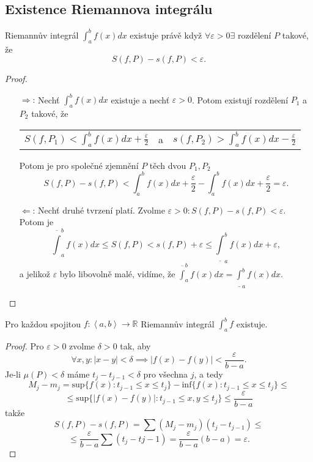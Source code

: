 \documentclass[../main.tex]{subfiles}
\begin{document}
\subsection{Existence Riemannova integrálu}
\begin{theorem}
	Riemannův integrál $\int^b_a f(x) dx$ existuje právě když $\forall \varepsilon > 0 \exists$ rozdělení $P$ takové, že
	\[S(f,P) - s(f,P) < \varepsilon.\]
\end{theorem}

\begin{proof}
	\begin{enumerate}
		\item[$\Rightarrow$:] Nechť $\int^b_a f(x) dx$ existuje a nechť $\varepsilon > 0$. Potom existují rozdělení $P_1$ a $P_2$ takové, že
	    \begin{center}
	        \begin{tabular}{ c c c }
	            $S(f,P_1) < \int^b_a f(x) dx + \frac{\varepsilon}{2}$ & a & $s(f,P_2) > \int^b_a f(x) dx - \frac{\varepsilon}{2}$  \\
	        \end{tabular}
	    \end{center}
	    Potom je pro společné zjemnění $P$ těch dvou $P_1,P_2$
	    \[S(f,P) - s(f,P) < \int^b_a f(x)dx + \frac{\varepsilon}{2} - \int^b_a f(x)dx + \frac{\varepsilon}{2} = \varepsilon.\]
	    \item[$\Leftarrow$:] Nechť druhé tvrzení platí. Zvolme $\varepsilon > 0 : S(f,P) - s(f,P) < \varepsilon.$ Potom je 
	    \[\overline{\int}^b_a f(x)dx \leq S(f,P) < s(f,P) + \varepsilon \leq \underline{\int}^b_a f(x)dx + \varepsilon,\]
	    a jelikož $\varepsilon$ bylo libovolně malé, vidíme, že $\overline{\int}^b_a f(x)dx = \underline{\int}^b_a f(x)dx.$
	\end{enumerate}
\end{proof}

\begin{theorem}
	Pro každou spojitou $f : \left<a,b\right> \rightarrow \mathbb{R}$ Riemannův integrál $\int^b_a f$ existuje.
\end{theorem}

\begin{proof}
	Pro $\varepsilon > 0 $ zvolme $\delta > 0$ tak, aby 
	\[\forall x,y : |x-y| < \delta \implies |f(x) - f(y)| < \frac{\varepsilon}{b-a}.\]
	Je-li $\mu(P) < \delta$ máme $t_j-t_{j-1} < \delta$ pro všechna $j$, a tedy
	\[M_j - m_j = \text{sup}\{f(x) : t_{j-1} \leq x \leq t_j\} - \text{inf}\{f(x) : t_{j-1} \leq x \leq t_j\} \leq\]
	\[\leq \text{sup}\{|f(x) - f(y)| : t_{j-1} \leq x,y \leq t_j\} \leq \frac{\varepsilon}{b-a}\]
	takže
	\[S(f,P) - s(f,P) = \sum (M_j - m_j)(t_j-t_{j-1})\leq\]
	\[\leq \frac{\varepsilon}{b-a}\sum (t_j-t{j-1}) = \frac{\varepsilon}{b-a}(b-a) = \varepsilon.\]
\end{proof}
\end{document}
